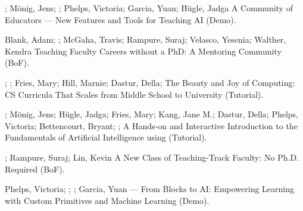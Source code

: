 \begin{etaremune}
    \setlength\itemsep{1em}


    \item{\me; Mönig, Jens; \dan; Phelps, Victoria; Garcia, Yuan; Hügle, Jadga
    \newline A Community of \snap{} Educators — New Features and Tools for Teaching AI (Demo). }

    \item{Blank, Adam; \me; McGaha, Travis; Rampure, Suraj; Velasco, Yesenia; Walther, Kendra
    \newline Teaching Faculty Careers without a PhD: A Mentoring Community (BoF). }

    \item{\me; \dan; Fries, Mary; Hill, Marnie; Dastur, Della; \lauren
    \newline The Beauty and Joy of Computing: CS Curricula That Scales from Middle School to University (Tutorial). }

    \item{\dan; Mönig, Jens; Hügle, Jadga; Fries, Mary; Kang, Jane M.; Dastur, Della; Phelps, Victoria; Bettencourt, Bryant; \me; \lauren
    \newline A Hands-on and Interactive Introduction to the Fundamentals of Artificial Intelligence using \snap{} (Tutorial). }




    \item{\me; Rampure, Suraj; Lin, Kevin
    \newline A New Class of Teaching-Track Faculty: No Ph.D. Required (BoF). }

    \item{Phelps, Victoria; \me; \dan; Garcia, Yuan
    \newline {} — From Blocks to AI: Empowering Learning with Custom Primitives and Machine Learning (Demo). }
    

\end{etaremune}
